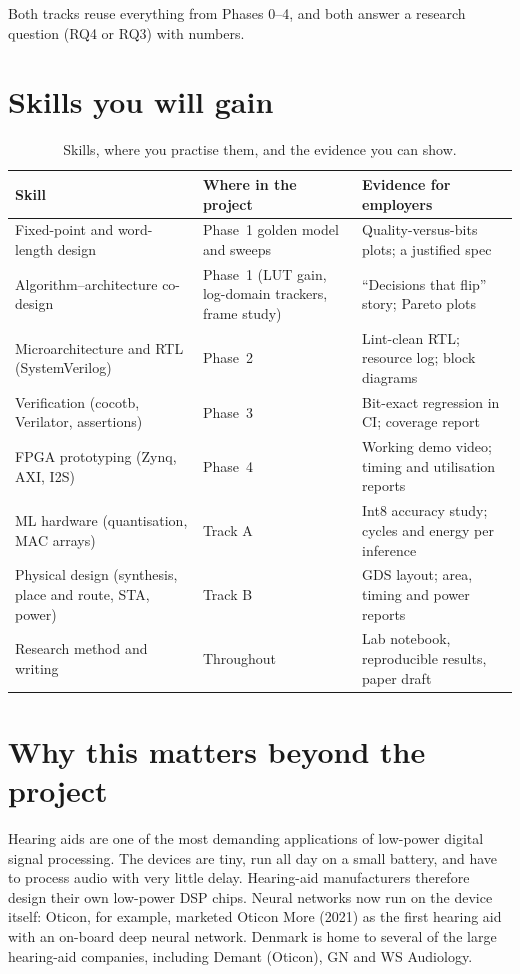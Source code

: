 Both tracks reuse everything from Phases 0--4, and both answer a research
question (RQ4 or RQ3) with numbers.

\section{Skills you will gain}\label{sec:overview:skills}

\begin{table}[htbp]
\centering\small
\caption{Skills, where you practise them, and the evidence you can show.}
\label{tab:overview:skills}
\begin{tabularx}{\textwidth}{@{}lLL@{}}
\toprule
Skill & Where in the project & Evidence for employers \\
\midrule
Fixed-point and word-length design & Phase~1 golden model and sweeps & Quality-versus-bits plots; a justified spec \\
Algorithm--architecture co-design & Phase~1 (LUT gain, log-domain trackers, frame study) & \enquote{Decisions that flip} story; Pareto plots \\
Microarchitecture and RTL (SystemVerilog) & Phase~2 & Lint-clean RTL; resource log; block diagrams \\
Verification (cocotb, Verilator, assertions) & Phase~3 & Bit-exact regression in CI; coverage report \\
FPGA prototyping (Zynq, AXI, I2S) & Phase~4 & Working demo video; timing and utilisation reports \\
ML hardware (quantisation, MAC arrays) & Track A & Int8 accuracy study; cycles and energy per inference \\
Physical design (synthesis, place and route, STA, power) & Track B & GDS layout; area, timing and power reports \\
Research method and writing & Throughout & Lab notebook, reproducible results, paper draft \\
\bottomrule
\end{tabularx}
\end{table}

\section{Why this matters beyond the project}\label{sec:overview:industry}

Hearing aids are one of the most demanding applications of low-power digital
signal processing. The devices are tiny, run all day on a small battery, and
have to process audio with very little delay. Hearing-aid manufacturers
therefore design their own low-power DSP chips. Neural networks now run on the
device itself: Oticon, for example, marketed Oticon More (2021) as the first
hearing aid with an on-board deep neural network. Denmark is home to several of
the large hearing-aid companies, including Demant (Oticon), GN and WS
Audiology.

